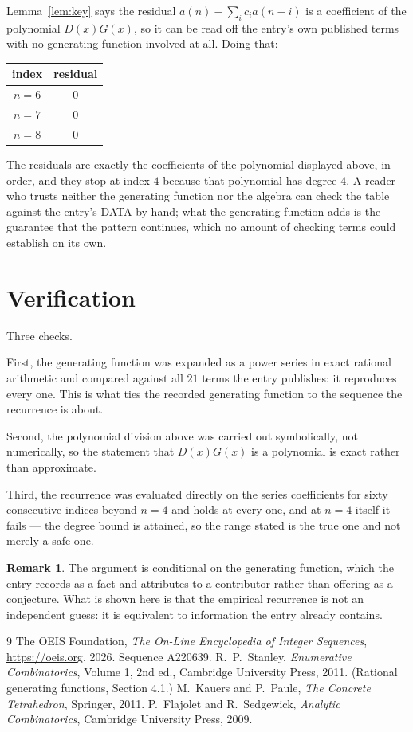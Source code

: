 \documentclass[11pt,a4paper]{article}
\theoremstyle{plain}
\theoremstyle{definition}
\newtheorem{remark}[theorem]{Remark}
\begin{document}
Lemma~\ref{lem:key} says the residual $a(n)-\sum_ic_ia(n-i)$ is a coefficient of the
polynomial $D(x)G(x)$, so it can be read off the entry's own published terms with no
generating function involved at all. Doing that:
\begin{center}
\begin{tabular}{cc}
index & residual \\ \hline
$n=6$ & $0$ \\
$n=7$ & $0$ \\
$n=8$ & $0$
\end{tabular}
\end{center}
The residuals are exactly the coefficients of the polynomial displayed above, in order, and
they stop at index $4$ because that polynomial has degree $4$. A reader who trusts
neither the generating function nor the algebra can check the table against the entry's DATA
by hand; what the generating function adds is the guarantee that the pattern continues, which
no amount of checking terms could establish on its own.

\section{Verification}

Three checks.

First, the generating function was expanded as a power series in exact rational arithmetic and
compared against all $21$ terms the entry publishes: it reproduces every one. This is
what ties the recorded generating function to the sequence the recurrence is about.

Second, the polynomial division above was carried out symbolically, not numerically, so the
statement that $D(x)G(x)$ is a polynomial is exact rather than approximate.

Third, the recurrence was evaluated directly on the series coefficients for sixty consecutive
indices beyond $n=4$ and holds at every one, and at $n=4$ itself it fails --- the
degree bound is attained, so the range stated is the true one and not merely a safe one.

\begin{remark}
The argument is conditional on the generating function, which the entry records as a fact and
attributes to a contributor rather than offering as a conjecture. What is shown here is that
the empirical recurrence is not an independent guess: it is equivalent to information the
entry already contains.
\end{remark}

\begin{thebibliography}{9}
 The OEIS Foundation, \emph{The On-Line Encyclopedia of Integer
Sequences}, \url{https://oeis.org}, 2026. Sequence A220639.
 R.~P.~Stanley, \emph{Enumerative Combinatorics}, Volume 1, 2nd ed.,
Cambridge University Press, 2011. (Rational generating functions, Section 4.1.)
 M.~Kauers and P.~Paule, \emph{The Concrete Tetrahedron}, Springer, 2011.
 P.~Flajolet and R.~Sedgewick, \emph{Analytic Combinatorics}, Cambridge
University Press, 2009.
\end{thebibliography}
\end{document}
